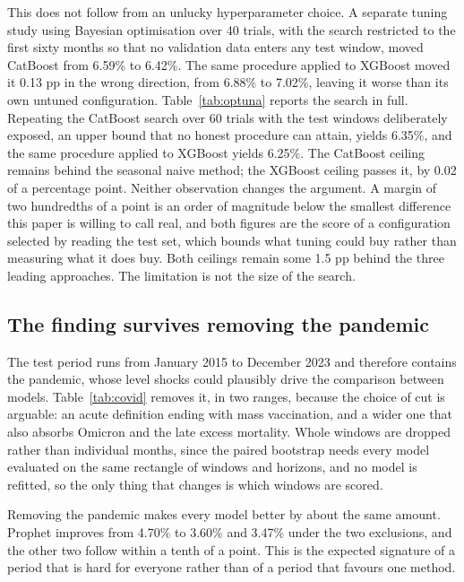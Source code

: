 This does not follow from an unlucky hyperparameter choice. A separate tuning study using
Bayesian optimisation over 40 trials, with the search restricted to the first sixty months
so that no validation data enters any test window, moved CatBoost from 6.59\% to 6.42\%.
The same procedure applied to XGBoost moved it 0.13 pp in the wrong direction, from 6.88\%
to 7.02\%, leaving it worse than its own untuned configuration.
Table~\ref{tab:optuna} reports the search in full.
Repeating the CatBoost search over 60 trials with
the test windows deliberately exposed, an upper bound that no honest procedure can attain,
yields 6.35\%, and the same procedure applied to XGBoost yields 6.25\%. The CatBoost ceiling
remains behind the seasonal naive method; the XGBoost ceiling passes it, by 0.02 of a
percentage point. Neither observation changes the argument. A margin of two hundredths of a
point is an order of magnitude below the smallest difference this paper is willing to call
real, and both figures are the score of a configuration selected by reading the test set,
which bounds what tuning could buy rather than measuring what it does buy. Both ceilings
remain some 1.5 pp behind the three leading approaches.
The limitation is not the size of the search.

\subsection{The finding survives removing the pandemic}



The test period runs from January 2015 to December 2023 and therefore contains the pandemic,
whose level shocks could plausibly drive the comparison between models. Table~\ref{tab:covid}
removes it, in two ranges, because the choice of cut is arguable: an acute definition ending
with mass vaccination, and a wider one that also absorbs Omicron and the late excess
mortality. Whole windows are dropped rather than individual months, since the paired
bootstrap needs every model evaluated on the same rectangle of windows and horizons, and no
model is refitted, so the only thing that changes is which windows are scored.

Removing the pandemic makes every model better by about the same amount. Prophet improves
from 4.70\% to 3.60\% and 3.47\% under the two exclusions, and the other
two follow within a tenth of a point. This is the expected signature of a period that is
hard for everyone rather than of a period that favours one method.

